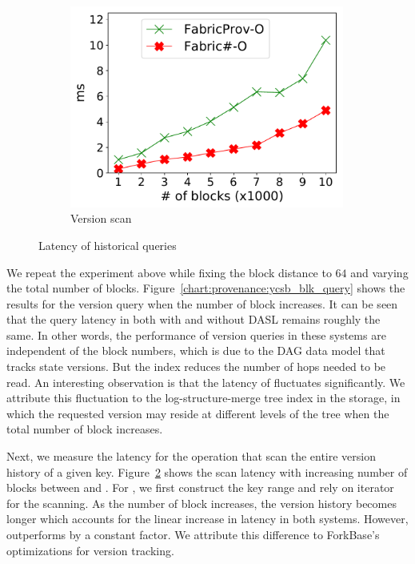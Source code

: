 \begin{figure}[t]
\begin{subfigure}{0.3\textwidth}
      \includegraphics[width=0.99\textwidth]{chart/provenance/ycsb_version_scan.pdf}
      \caption{Version scan}
      \label{chart:provenance:ycsb_version_scan}
    \end{subfigure}
    \caption{Latency of historical queries}
\end{figure}
We repeat the experiment above while fixing the block distance to $64$ and varying the total number of blocks.
Figure~\ref{chart:provenance:ycsb_blk_query} shows the results for the version query when the number of block increases.
It can be seen that the query latency in both {\fsO} with and without DASL remains roughly the same. In other words,
the performance of version queries in these systems are independent of the block numbers, which is due to the
DAG data model that tracks state versions. But the index reduces the
number of hops needed to be read. An interesting observation is that the latency of {\fsPrO} fluctuates
significantly. We attribute this fluctuation to the log-structure-merge tree index in the storage, in which the
requested version may reside at different levels of the tree when the total number of block increases. 

Next, we measure the latency for the operation that scan the entire version history of a given key.
Figure~\ref{chart:provenance:ycsb_version_scan} shows the scan latency with increasing number of blocks between {\fsPrO} and {\fsO}.  
For {\fsPrO}, we first construct the key range and rely on iterator for the scanning.  As the number of block
increases, the version history becomes longer which accounts for the linear increase in latency in both
systems.  However, {\fsO} outperforms {\fsPrO} by a constant factor. We attribute this difference to ForkBase's
optimizations for version tracking. 



